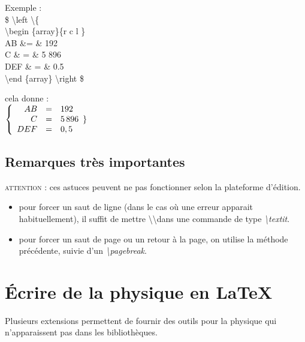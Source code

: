 \documentclass[a4paper, 10pt]{book}
\begin{document}
Exemple : \\

\textsf{ \$
\textbackslash left \textbackslash \{ \\
\textbackslash begin \{array\}\{r c l \} \\
\hspace{5 cm} AB \&=  \& 192 \\
\hspace{5 cm} C \& = \& 5 896 \\
\hspace{5 cm} DEF \& = \& 0.5 \\
\textbackslash end \{array\}
\textbackslash right \$
}
\vspace{0.5 cm}

cela donne : \\

$   \left \{ 
   \begin{array}{r c l}
      AB  & = & 192 \\
      C   & = & 5\,896 \\
      DEF & = & 0,5
   \end{array} \}
   \right . $
\vspace{0.8 cm}

\section{Remarques très importantes}

\textsc{attention :} ces astuces peuvent ne pas fonctionner selon la plateforme d'édition.

\begin{itemize}
\item pour forcer un saut de ligne (dans le cas où une erreur apparait habituellement), il suffit de mettre \textbackslash \textbackslash dans une commande de type \textit{\textbackslash textit}.
\item pour forcer un saut de page ou un retour à la page, on utilise la méthode précédente, suivie d'un \textit{\textbackslash pagebreak}.
\end{itemize}

\chapter{Écrire de la physique en LaTeX}

Plusieurs extensions permettent de fournir des outils pour la physique qui n'apparaissent pas dans les bibliothèques. 

\vspace{0.8 cm}
\end{document}
